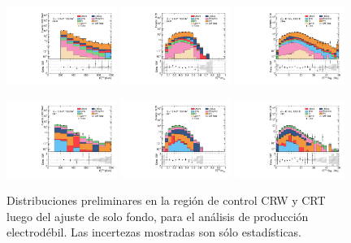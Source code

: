 \begin{figure}

\centering

    \includegraphics[width=0.32\textwidth]{images/analysis_EWK/v192_2_nosyst/can_CRW_met_et_afterFit.pdf}
    \includegraphics[width=0.32\textwidth]{images/analysis_EWK/v192_2_nosyst/can_CRW_met_etmeff_afterFit.pdf}
    \includegraphics[width=0.32\textwidth]{images/analysis_EWK/v192_2_nosyst/can_CRW_met_sig_obj_afterFit.pdf}

    \includegraphics[width=0.32\textwidth]{images/analysis_EWK/v192_2_nosyst/can_CRT_met_et_afterFit.pdf}
    \includegraphics[width=0.32\textwidth]{images/analysis_EWK/v192_2_nosyst/can_CRT_met_etmeff_afterFit.pdf}
    \includegraphics[width=0.32\textwidth]{images/analysis_EWK/v192_2_nosyst/can_CRT_met_sig_obj_afterFit.pdf}

    \caption{Distribuciones preliminares en la región de control CRW y CRT luego del ajuste de solo fondo, para el análisis de producción electrodébil. Las incertezas mostradas son sólo estadísticas.}
    \label{fig:crw_crt_dist_ewk}

\end{figure}


